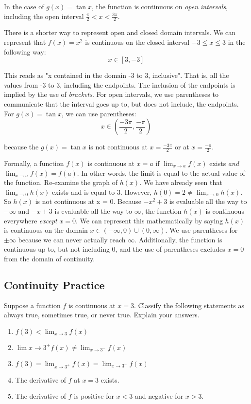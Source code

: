 In the case of $g(x) = \tan{x}$, the function is continuous on \textit{open 
intervals}, including the open interval $\frac{\pi}{2} < x < \frac{3\pi}{2}$.

There is a shorter way to represent open and closed domain intervals. We can 
represent that $f(x) = x^2$ is continuous on the closed interval $-3 \leq x \leq 3$ 
in the following way: $$x \in \left[3, -3 \right]$$

This reads as "x contained in the domain -3 to 3, inclusive". That is, all the 
values from -3 to 3, including the endpoints. The inclusion of the endpoints is 
implied by the use of \textit{brackets}. For open intervals, we use parentheses to 
communicate that the interval goes up to, but does not include, the endpoints. For 
$g(x) = \tan{x}$, we can use parentheses: 
$$x \in \left(\frac{-3\pi}{2}, \frac{-\pi}{2}\right)$$

because the $g(x) = \tan{x}$ is not continuous at $x=\frac{-3\pi}{2}$ or at 
$x=\frac{-\pi}{2}$.



Formally, a function $f(x)$ is continuous at $x=a$ if $\lim_{x\to a}f(x)$ exists 
\textit{and} $\lim_{x\to a}f(x) = f(a)$. In other words, the limit is equal to the actual 
value of the function. Re-examine the graph of $h(x)$. We have already seen that $
\lim_{x\to 0}h(x)$ exists and is equal to 3. However, $h(0) = 2 \neq \lim_{x\to0}
h(x)$. So $h(x)$ is not continuous at x = 0. Because $-x^2+3$ is evaluable all the 
way to $-\infty$ and $-x+3$ is evaluable all the way to $\infty$, the function 
$h(x)$ is continuous everywhere \textit{except} $x=0$. We can represent this 
mathematically by saying $h(x)$ is continuous on the domain $x \in \left(-\infty, 
0\right)\cup \left(0, \infty\right)$. We use parentheses for $\pm\infty$ because we 
can never actually reach $\infty$. Additionally, the function is continuous up to, 
but not including $0$, and the use of parentheses excludes $x=0$ from the domain of 
continuity.

\subsection{Continuity Practice}
\begin{Exercise} Suppose a function $f$ is 
continuous at $x = 3$. Classify the following statements as always true, 
sometimes true, or never true. Explain your answers. 
\begin{enumerate}
\item $f(3) < \lim_{x \to 3} f(x)$
\item $\lim{x \to 3^+} f(x) \neq \lim_{x \to 3^-} f(x)$
\item $f(3) = \lim_{x \to 3^+} f(x) = \lim_{x \to 3^-} f(x)$
\item The derivative of $f$ at $x = 3$ exists.
\item The derivative of $f$ is positive for $x < 3$ and negative for $x > 3$.
\end{enumerate}
\end{Exercise}

